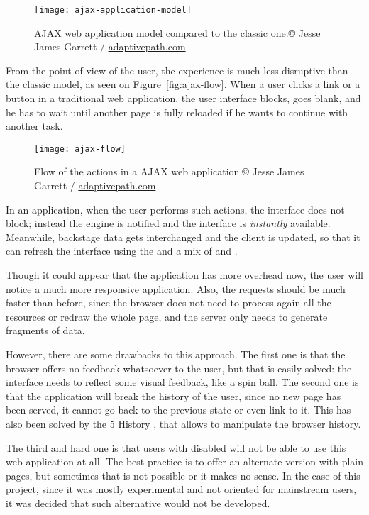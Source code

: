 \begin{figure}[htbp]
  \centering
    \texttt{[image: ajax-application-model]}
  \caption[AJAX web application model]{AJAX web application model compared to the classic one.\newline© Jesse James Garrett / \url{adaptivepath.com}}
  \label{fig:ajax-application-model}
\end{figure}

From the point of view of the user, the experience is much less disruptive than the classic model, as seen on Figure~\vref{fig:ajax-flow}.
When a user clicks a link or a button in a traditional web application, the user interface blocks, goes blank, and he has to wait until another page is fully reloaded if he wants to continue with another task.

\begin{figure}[htbp]
  \centering
    \texttt{[image: ajax-flow]}
    \caption[AJAX flow]{Flow of the actions in a AJAX web application.\newline© Jesse James Garrett / \url{adaptivepath.com}}
  \label{fig:ajax-flow}
\end{figure}

In an  application, when the user performs such actions, the interface does not block; instead the  engine is notified and the interface is \emph{instantly} available.
Meanwhile, backstage data gets interchanged and the client is updated, so that it can refresh the interface using the  and a mix of  and .

Though it could appear that the application has more overhead now, the user will notice a much more responsive application. Also, the requests should be much faster than before, since the browser does not need to process again all the resources or redraw the whole page, and the server only needs to generate fragments of data.

However, there are some drawbacks to this approach.
The first one is that the browser offers no feedback whatsoever to the user, but that is easily solved: the interface needs to reflect some visual feedback, like a spin ball.
The second one is that the application will break the history of the user, since no new page has been served, it cannot go back to the previous state or even link to it.
This has also been solved by the 5 History , that allows to manipulate the browser history.

The third and hard one is that users with  disabled will not be able to use this web application at all.
The best practice is to offer an alternate version with plain  pages, but sometimes that is not possible or it makes no sense.
In the case of this project, since it was mostly experimental and not oriented for mainstream users, it was decided that such alternative would not be developed.

